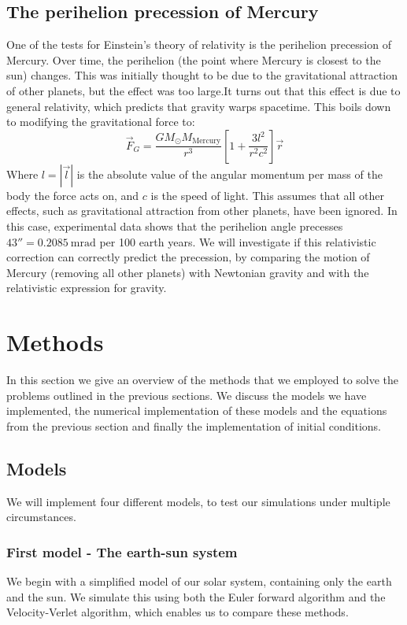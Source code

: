 \documentclass[a4paper, 10pt]{article}
\begin{document}
\subsection{The perihelion precession of Mercury}\label{GR_section}
One of the tests for Einstein's theory of relativity is the perihelion precession of Mercury.  Over time, the perihelion (the point where Mercury is closest to the sun) changes. This was initially thought to be due to the gravitational attraction of other planets, but the effect was too large.It turns out that this effect is due to general relativity, which predicts that gravity warps spacetime. This boils down to modifying the gravitational force to:
\begin{equation}\label{eq:GR_equation}
\vec{F}_G=\frac{GM_{\odot}M_{\mathrm{Mercury}}}{r^3}\left[1+\frac{3l^2}{r^2c^2}\right]\vec{r}
\end{equation}
Where $l=|\vec{l}|$ is the absolute value of the angular momentum per mass of the body the force acts on, and $c$ is the speed of light. This assumes that all other effects, such as gravitational attraction from other planets, have been ignored. In this case, experimental data shows that the perihelion angle precesses $43''=0.2085\  \mathrm{mrad}$ per 100 earth years. We will investigate if this relativistic correction can correctly predict the precession, by comparing the motion of Mercury (removing all other planets) with Newtonian gravity and with the relativistic expression for gravity.
\newpage
\section{Methods}
In this section we give an overview of the methods that we employed to solve the problems outlined in the previous sections. We discuss the models we have implemented, the numerical implementation of these models and the equations from the previous section and finally the implementation of initial conditions.
\subsection{Models}\label{models}
We will implement four different models, to test our simulations under multiple circumstances. 
\subsubsection{First model - The earth-sun system}\label{First_model}
We begin with a simplified model of our solar system, containing only the earth and the sun. We simulate this using both the Euler forward algorithm and the Velocity-Verlet algorithm, which enables us to compare these methods. 
\end{document}
